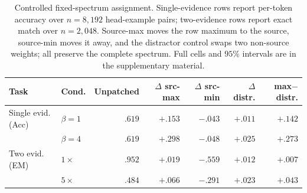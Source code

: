 \documentclass{article}
\newcommand{\helpful}[1]{\textcolor{pennblue}{\bfseries #1}}
\newcommand{\harmful}[1]{\textcolor{pennred}{\bfseries #1}}
\newcommand{\neutral}[1]{\textcolor{controlgray}{#1}}
\begin{document}
\begin{table}[!t]
\centering
\small
\setlength{\tabcolsep}{3pt}
\begin{tabular*}{\columnwidth}{@{\extracolsep{\fill}}llrrrrr}
\toprule
Task & Cond. & Unpatched & $\Delta$ src-max & $\Delta$ src-min & $\Delta$ distr. & \textbf{max$-$distr.} \\
\midrule
Single evid. (Acc) & $\beta=1$ & $.619$ & \helpful{$+.153$} & \harmful{$-.043$} & \neutral{$+.011$} & \helpful{$+.142$} \\
 & $\beta=4$ & $.619$ & \helpful{$+.298$} & \harmful{$-.048$} & \neutral{$+.025$} & \helpful{$+.273$} \\
\midrule
Two evid. (EM) & $1\times$ & $.952$ & \helpful{$+.019$} & \harmful{$-.559$} & \neutral{$+.012$} & \helpful{$+.007$} \\
 & $5\times$ & $.484$ & \helpful{$+.066$} & \harmful{$-.291$} & \neutral{$+.023$} & \helpful{$+.043$} \\
\bottomrule
\end{tabular*}
\caption{Controlled fixed-spectrum assignment. Single-evidence rows report per-token accuracy over $n=8{,}192$
head-example pairs; two-evidence rows report exact match over $n=2{,}048$. Source-max moves the row maximum to
the source, source-min moves it away, and the distractor control swaps two non-source weights; all preserve the
complete spectrum. Full cells and $95\%$ intervals are in the supplementary material.}
\label{tab:controlled-summary}
\end{table}
\end{document}
